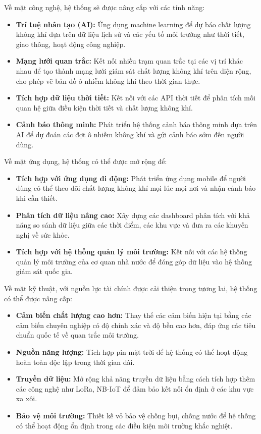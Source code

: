 \documentclass{article} %
\begin{document}
Về mặt công nghệ, hệ thống sẽ được nâng cấp với các tính năng:
\begin{itemize}
    \item \textbf{Trí tuệ nhân tạo (AI):} Ứng dụng machine learning để dự báo chất lượng không khí dựa trên dữ liệu lịch sử và các yếu tố môi trường như thời tiết, giao thông, hoạt động công nghiệp.
    \item \textbf{Mạng lưới quan trắc:} Kết nối nhiều trạm quan trắc tại các vị trí khác nhau để tạo thành mạng lưới giám sát chất lượng không khí trên diện rộng, cho phép vẽ bản đồ ô nhiễm không khí theo thời gian thực.
    \item \textbf{Tích hợp dữ liệu thời tiết:} Kết nối với các API thời tiết để phân tích mối quan hệ giữa điều kiện thời tiết và chất lượng không khí.
    \item \textbf{Cảnh báo thông minh:} Phát triển hệ thống cảnh báo thông minh dựa trên AI để dự đoán các đợt ô nhiễm không khí và gửi cảnh báo sớm đến người dùng.
\end{itemize}

Về mặt ứng dụng, hệ thống có thể được mở rộng để:
\begin{itemize}
    \item \textbf{Tích hợp với ứng dụng di động:} Phát triển ứng dụng mobile để người dùng có thể theo dõi chất lượng không khí mọi lúc mọi nơi và nhận cảnh báo khi cần thiết.
    \item \textbf{Phân tích dữ liệu nâng cao:} Xây dựng các dashboard phân tích với khả năng so sánh dữ liệu giữa các thời điểm, các khu vực và đưa ra các khuyến nghị về sức khỏe.
    \item \textbf{Tích hợp với hệ thống quản lý môi trường:} Kết nối với các hệ thống quản lý môi trường của cơ quan nhà nước để đóng góp dữ liệu vào hệ thống giám sát quốc gia.
\end{itemize}

Về mặt kỹ thuật, với nguồn lực tài chính được cải thiện trong tương lai, hệ thống có thể được nâng cấp:
\begin{itemize}
    \item \textbf{Cảm biến chất lượng cao hơn:} Thay thế các cảm biến hiện tại bằng các cảm biến chuyên nghiệp có độ chính xác và độ bền cao hơn, đáp ứng các tiêu chuẩn quốc tế về quan trắc môi trường.
    \item \textbf{Nguồn năng lượng:} Tích hợp pin mặt trời để hệ thống có thể hoạt động hoàn toàn độc lập trong thời gian dài.
    \item \textbf{Truyền dữ liệu:} Mở rộng khả năng truyền dữ liệu bằng cách tích hợp thêm các công nghệ như LoRa, NB-IoT để đảm bảo kết nối ổn định ở các khu vực xa xôi.
    \item \textbf{Bảo vệ môi trường:} Thiết kế vỏ bảo vệ chống bụi, chống nước để hệ thống có thể hoạt động ổn định trong các điều kiện môi trường khắc nghiệt.
\end{itemize}



\newpage

{} %
\nocite{*}
\end{document}

